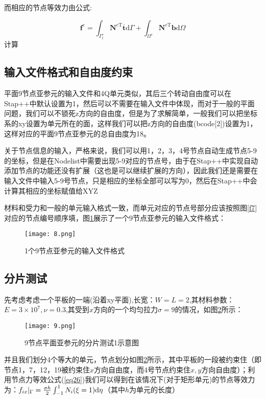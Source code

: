 \documentclass[forprint]{WHUBachelor}
\begin{document}
而相应的节点等效力由公式:

\begin{equation}
\boldsymbol{f}^{e}=\int_{\Gamma_{t}^{e}}\boldsymbol{N}^{e\mathrm{T}}\overline{\boldsymbol{t}}\mathrm{d}\Gamma+\int_{\Omega^{e}}\boldsymbol{N}^{e\mathrm{T}}\boldsymbol{b}\mathrm{d}\Omega\label{eq26}
\end{equation}
计算

\subsection{输入文件格式和自由度约束}

平面9节点亚参元的输入文件和4Q单元类似，其后三个转动自由度可以在Stap++中默认设置为1，然后可以不需要在输入文件中体现，而对于一般的平面问题，我们可以不锁死z方向的自由度，但是为了求解简单，一般我们可以把坐标系的xy设置为单元所在的面，这样我们可以把z方向的自由度(bcode{[}2{]})设置为1，这样对应的平面9节点亚参元的总自由度为18。

关于节点信息的输入，严格来说，我们可以用1，2，3，4号节点自动生成节点5-9的坐标，但是在Nodelist中需要出现5-9对应的节点号，由于在Stap++中实现自动添加节点的功能还没有扩展（这也是可以继续扩展的方向），因此我们还是需要在输入文件中输入5-9号节点，只是相应的坐标全部可以写为0，然后在Stap++中会计算其相应的坐标赋值给XYZ

材料和受力和一般的单元输入格式一致，而单元对应的节点号部分应该按照图\ref{f7}对应的节点编号顺序填，图\ref{f8}展示了一个9节点亚参元的输入文件格式：

\begin{figure}[H]
\centering  
\texttt{[image: 8.png]} 
\caption{1个9节点亚参元的输入文件格式} 
\label{f8} 
\end{figure}

\subsection{分片测试}

先考虑考虑一个平板的一端(沿着xy平面),长宽：$W=L=2$,其材料参数：$E=3\times10^{7},\nu=0.3$,其受到$x$方向的一个均匀拉力$\sigma=9$的情况，如图\ref{f9}所示：

\begin{figure}[H]
\centering  
\texttt{[image: 9.png]} 
\caption{9节点平面亚参元的分片测试1示意图} 
\label{f9} 
\end{figure}并且我们划分4个等大的单元，节点划分如图\ref{f9}所示，其中平板的一段被约束住（即节点1，7，12，19被约束住$x$方向自由度，而4号节点约束住$x,y$方向自由度）；利用节点力等效公式(\ref{eq26})我们可以得到在该情况下(对于矩形单元)的节点等效力为：$f_{ix}|_{\Gamma}=\frac{\sigma h}{2}\int_{-1}^{1}N_{i}(\xi=1){\rm d\eta}$（其中$h$为单元的长度）
\end{document}
